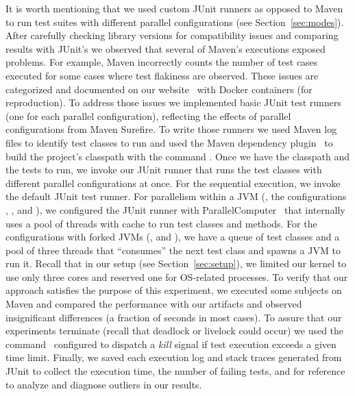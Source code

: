 

It is worth mentioning that we used custom JUnit runners as opposed to
Maven to run test suites with
different parallel configurations (see Section~\ref{sec:modes}).
After carefully checking library versions for compatibility issues and
comparing results with JUnit's we observed that several of Maven's
executions exposed problems.  For example, Maven incorrectly counts
the number of test cases executed for some cases where test flakiness
are observed.  These issues are categorized and documented on our
website~\cite{ourwebpage} with Docker containers (for reproduction).
To address those issues we implemented basic JUnit test runners (one
for each parallel configuration), reflecting the effects of parallel
configurations from Maven Surefire.  To write those runners we used
Maven log files to identify test classes to run and used the Maven
dependency plugin~\cite{maven-dep} to build the project's classpath
with the command . Once we have
the classpath and the tests to run, we invoke our JUnit runner that
runs the test classes with different parallel configurations at
once. For the sequential execution, we invoke the default JUnit test
runner. For parallelism within a JVM (\ie, the configurations
\SeqClassParMeth{}, \ParClassSeqMeth{}, and \ParClassParMeth{}), we
configured the JUnit runner with
ParallelComputer~\cite{junit-parallel} that internally uses a pool of
threads with cache to run test classes and methods. For the
configurations with forked JVMs (\ie, \ForkSeq{} and \ForkParMeth{}),
we have a queue of test classes and a pool of three threads that
``consumes'' the next test class and spawns a JVM to run it.  Recall
that in our setup (see Section~\ref{sec:setup}), we limited our kernel
to use only three cores and reserved one for OS-related processes.  To
verify that our approach satisfies the purpose of this experiment, we
executed some subjects on Maven and compared the performance with our
artifacts and observed insignificant differences (a fraction of
seconds in most cases).  To assure that our experiments terminate
(recall that deadlock or livelock could occur) we used the
 command~\cite{timeout-cmd} configured to dispatch a
\emph{kill} signal if test execution exceeds a given time
limit. Finally, we saved each execution log and stack traces generated
from JUnit to collect the execution time, the number of failing tests,
and for reference to analyze and diagnose outliers in our results.

